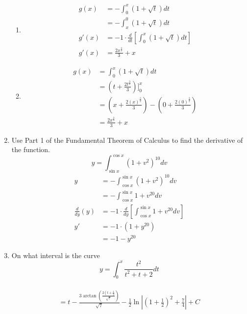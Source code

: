 \documentclass{article}
\begin{document}
\begin{enumerate}
\begin{center}
	\end{center}
	\begin{enumerate}
		\item $$\begin{align}
		g(x)&=- \int_{0}^{x}(1+\sqrt{t}) dt\\
		&=- \int_{x}^{0}(1+\sqrt{t})dt\\
		g'(x)&=-1\cdot\frac{d}{dt}\left[\int_{0}^{x}(1+\sqrt{t}) dt\right]\\
		g'(x)&=\boxed{\frac{2x^\frac{2}{3}}{3}+x}
	\end{align}$$
		\item $$\begin{align}
			g(x)&=\int_0^x\left(1+\sqrt{t}\right)dt\\
			&=\left(t+\frac{2t^\frac{3}{2}}{3}\right)\Bigg]^x_0\\
			&=\left(x+\frac{2(x)^\frac{3}{2}}{3}\right)-\left(0+\frac{2(0)^\frac{3}{2}}{3}\right)\\
			&=\boxed{\frac{2x^\frac{2}{3}}{3}+x}
		\end{align}$$
	\end{enumerate}
\pagebreak
\setcounter{enumi}{17}
	\item Use Part 1 of the Fundamental Theorem of Calculus to find the derivative of the function. $$y=\int_{\sin x}^{\cos x}(1+v^2)^{10} dv$$\newline
	$$\begin{align}
		y&=- \int_{\cos x}^{\sin x}(1+v^2)^{10} dv\\
		&=- \int_{\cos x}^{\sin x}1+v^{20} dv\\
		\frac{d}{dy}(y)&=-1\cdot\frac{d}{dy}\left[\int_{\cos x}^{\sin x}1+v^{20} dv\right]\\
		y'&=-1\cdot \left(1+y^{20}\right)\\
		&=\boxed{-1-y^{20}}
	\end{align}$$
\setcounter{enumi}{22}
	\item On what interval is the curve $$y=\int_{0}^{x}\frac{t^2}{t^2+t+2}dt$$\
	$$\begin{align}
		= t-\frac{3\arctan \left(\frac{2\left(t+\frac{1}{2}}{\sqrt{7}}\right)}{\sqrt{7}}-\frac{1}{2}\ln\left|\left(1+\frac{1}{2}\right)^2+\frac{7}{4}\right|+C\\

\end{align}$$
\end{enumerate}
\end{document}
